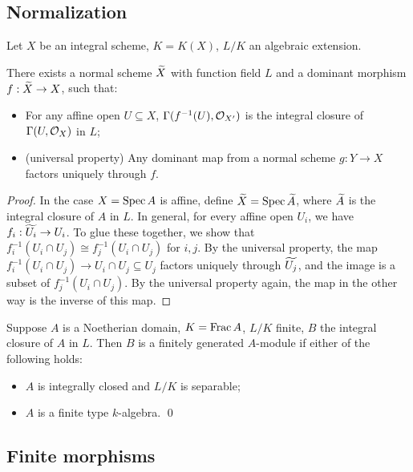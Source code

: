 \documentclass[11pt]{amsart}
\begin{document}
\subsection{Normalization}

Let $X$ be an integral scheme, $K = K(X)$, $L/K$ an algebraic extension.

\begin{prop}
    There exists a normal scheme $\widetilde{X}$ with function field $L$ and a dominant morphism $f: \widetilde{X} \to X$, such that:
    \begin{itemize}
        \item For any affine open $U\subseteq X$, $\Gamma(f^{-1}(U), \mathcal{O}_{X'})$ is the integral closure of $\Gamma(U,\mathcal{O}_X)$ in $L$;
        \item (universal property) Any dominant map from a normal scheme $g:Y\to X$ factors uniquely through $f$.
    \end{itemize}
\end{prop}


\begin{proof}
    In the case $X = \operatorname{Spec} A$ is affine, define $\widetilde{X} = \operatorname{Spec} \widetilde{A}$, where $\widetilde{A}$ is the integral closure of $A$ in $L$. In general, for every affine open $U_i$, we have $f_i: \widetilde{U_i}\to U_i$. To glue these together, we show that $f_i^{-1}(U_i\cap U_j) \cong f_j^{-1}(U_i\cap U_j)$ for $i,j$. By the universal property, the map $f_i^{-1}(U_i\cap U_j) \to U_i\cap U_j \subseteq U_j$ factors uniquely through $\widetilde{U_j}$, and the image is a subset of $f_j^{-1}(U_i\cap U_j)$. By the universal property again, the map in the other way is the inverse of this map.    
\end{proof}

\begin{prop}
    Suppose $A$ is a Noetherian domain, $K = \operatorname{Frac} A$, $L/K$ finite, $B$ the integral closure of $A$ in $L$. Then $B$ is a finitely generated $A$-module if either of the following holds:
    \begin{itemize}
        \item $A$ is integrally closed and $L/K$ is separable;
        \item $A$ is a finite type $k$-algebra. \qed
    \end{itemize}
\end{prop}

\subsection{Finite morphisms}
\end{document}
